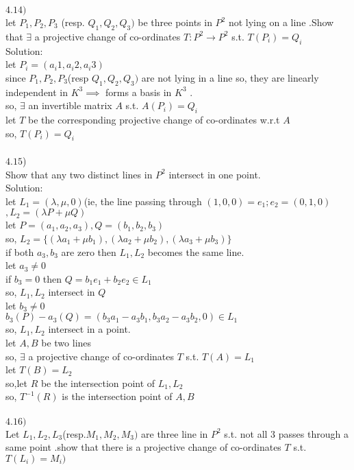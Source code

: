 \documentclass[11pt]{amsart}
\theoremstyle{definition}
\begin{document}
$4.14)$\\
let $P_1,P_2,P_3$ (resp. $Q_1,Q_2,Q_3)$ be three points in $P^2$ not lying on a line .Show that $\exists$ a projective change of co-ordinates $T:P^2\to P^2$ s.t. $T(P_i)=Q_i$\\
Solution:\\
let $P_i=(a_i1,a_i2,a_i3)$ \\
since $P_1,P_2,P_3$(resp $Q_1,Q_2,Q_3)$ are not lying in a line so, they are linearly independent in $K^3\implies $ forms a basis in $K^3$ .\\
so, $\exists$ an invertible matrix $A$ s.t. $A(P_i)=Q_i$\\
let $T$ be the corresponding projective change of co-ordinates w.r.t $A$\\
so, $T(P_i)=Q_i$\\\\
$4.15$)\\
Show that any two distinct lines in $P^2$ intersect in one point.\\
Solution:\\
let $L_1=(\lambda,\mu,0)$(ie, the line passing through $(1,0,0)=e_1;e_2=(0,1,0)$ $,L_2=(\lambda P+\mu Q)$\\
let $P=(a_1,a_2,a_3),Q=(b_1,b_2,b_3)$\\
so, $L_2=\{(\lambda a_1+\mu b_1),(\lambda a_2+\mu b_2),(\lambda a_3+\mu b_3)\}$\\
if both $a_3,b_3$ are zero then $L_1,L_2$ becomes the same line.\\
let $a_3\neq 0$\\
if $b_3=0$ then $Q=b_1 e_1+b_2 e_2\in L_1$\\
so, $L_1,L_2$ intersect in $Q$\\
let $b_3\neq 0$\\
$b_3(P)-a_3(Q)=(b_3a_1-a_3b_1,b_3a_2-a_3b_2,0)\in L_1$\\
so, $L_1,L_2$ intersect in a point.\\
let $A,B$ be two lines \\
so, $\exists$ a projective change of co-ordinates $T$ s.t. $T(A)=L_1$\\
let $T(B)=L_2$\\
so,let $R$ be the intersection point of $L_1,L_2$\\
so, $T^{-1}(R)$ is the intersection point of $A,B$\\\\
$4.16)$\\
Let $L_1,L_2,L_3$(resp.$M_1,M_2,M_3)$ are three line in $P^2$ s.t. not all $3$ passes through a same point .show that there is a projective change of co-ordinates $T$ s.t. $T(L_i)=M_i)$\\
\end{document}
